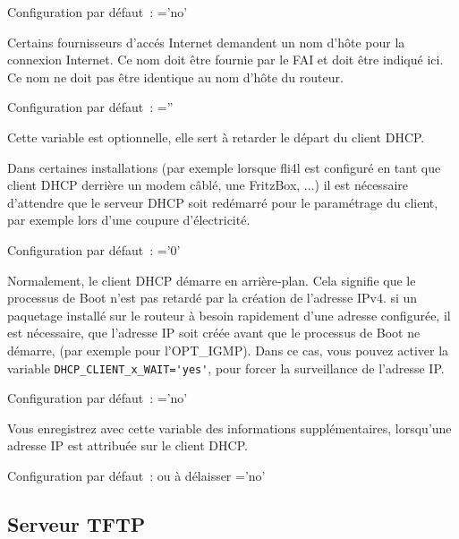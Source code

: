 \begin{description}
      Configuration par défaut~: ='no'


Certains fournisseurs d'accés Internet demandent un nom d'hôte pour la connexion
Internet. Ce nom doit être fournie par le FAI et doit être indiqué ici. Ce nom
ne doit pas être identique au nom d'hôte du routeur.

      Configuration par défaut~: =''


Cette variable est optionnelle, elle sert à retarder le départ du client DHCP.

Dans certaines installations (par exemple lorsque fli4l est configuré en tant
que client DHCP derrière un modem câblé, une FritzBox, ...) il est nécessaire
d'attendre que le serveur DHCP soit redémarré pour le paramétrage du client,
par exemple lors d'une coupure d'électricité.

      Configuration par défaut~: ='0'


Normalement, le client DHCP démarre en arrière-plan. Cela signifie que le
processus de Boot n'est pas retardé par la création de l'adresse IPv4. si un
paquetage installé sur le routeur à besoin rapidement d'une adresse configurée,
il est nécessaire, que l'adresse IP soit créée avant que le processus de Boot
ne démarre, (par exemple pour l'OPT\_IGMP). Dans ce cas, vous pouvez activer
la variable \verb+DHCP_CLIENT_x_WAIT='yes'+, pour forcer la surveillance de
l'adresse IP.

      Configuration par défaut~: ='no'


Vous enregistrez avec cette variable des informations supplémentaires,
lorsqu'une adresse IP est attribuée sur le client DHCP.

      Configuration par défaut~: ou à délaisser ='no'

\end{description}

\subsection {Serveur TFTP}

